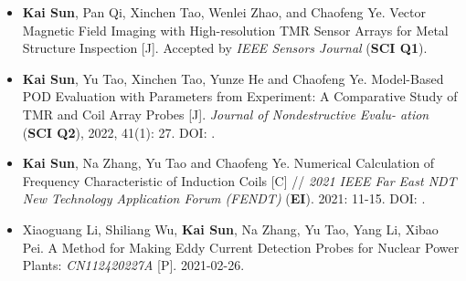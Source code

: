 \begin{itemize}[leftmargin=1.5em]
    \item \textbf{Kai Sun}, Pan Qi, Xinchen Tao, Wenlei Zhao, and Chaofeng Ye. Vector Magnetic Field Imaging with High-resolution TMR Sensor Arrays for Metal Structure Inspection [J]. Accepted by \emph{IEEE Sensors Journal} (\textbf{SCI Q1}).
    \\{ \footnotesize {}}

    \item \textbf{Kai Sun}, Yu Tao, Xinchen Tao, Yunze He and Chaofeng Ye. Model-Based POD Evaluation with Parameters from Experiment: A Comparative Study of TMR and Coil Array Probes [J]. \textsl{Journal of Nondestructive Evalu- ation} (\textbf{SCI Q2}), 2022, 41(1): 27. DOI: .
    \\{ \footnotesize {}}

    \item \textbf{Kai Sun}, Na Zhang, Yu Tao and Chaofeng Ye. Numerical Calculation of Frequency Characteristic of Induction Coils [C] // \textsl{2021 IEEE Far East NDT New Technology Application Forum (FENDT)} (\textbf{EI}). 2021: 11-15. DOI: .
    \\{ \footnotesize {}}

    \item Xiaoguang Li, Shiliang Wu, \textbf{Kai Sun}, Na Zhang, Yu Tao, Yang Li, Xibao Pei. A Method for Making Eddy Current Detection Probes for Nuclear Power Plants: \textsl{CN112420227A} [P]. 2021-02-26.
\end{itemize}
\fi